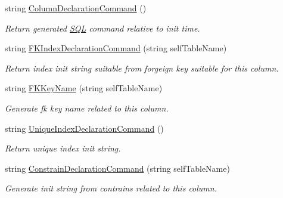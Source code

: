 \begin{DoxyCompactItemize}
\item 
string \mbox{\hyperlink{struct_uniform_data_operator_1_1_s_q_l_1_1_tables_1_1_table_column_meta_a787d487a7f78fa047adebb048756a3a5}{Column\+Declaration\+Command}} ()
\begin{DoxyCompactList}\small\item\em Return generated \mbox{\hyperlink{namespace_uniform_data_operator_1_1_s_q_l}{S\+QL}} command relative to init time. \end{DoxyCompactList}\item 
string \mbox{\hyperlink{struct_uniform_data_operator_1_1_s_q_l_1_1_tables_1_1_table_column_meta_ace15a20fed1d2abba337afe1649025e9}{F\+K\+Index\+Declaration\+Command}} (string self\+Table\+Name)
\begin{DoxyCompactList}\small\item\em Return index init string suitable from forgeign key suitable for this column. \end{DoxyCompactList}\item 
string \mbox{\hyperlink{struct_uniform_data_operator_1_1_s_q_l_1_1_tables_1_1_table_column_meta_a05d36834e7f15a94c9f9a4bbdaeacfb5}{F\+K\+Key\+Name}} (string self\+Table\+Name)
\begin{DoxyCompactList}\small\item\em Generate fk key name related to this column. \end{DoxyCompactList}\item 
string \mbox{\hyperlink{struct_uniform_data_operator_1_1_s_q_l_1_1_tables_1_1_table_column_meta_af0156c8b36f305d3715cd87d8b6c4d17}{Unique\+Index\+Declaration\+Command}} ()
\begin{DoxyCompactList}\small\item\em Return unique index init string. \end{DoxyCompactList}\item 
string \mbox{\hyperlink{struct_uniform_data_operator_1_1_s_q_l_1_1_tables_1_1_table_column_meta_a33a985719580b9ced15a87d93af7c4e3}{Constrain\+Declaration\+Command}} (string self\+Table\+Name)
\begin{DoxyCompactList}\small\item\em Generate init string from contrains related to this column. \end{DoxyCompactList}\end{DoxyCompactItemize}
